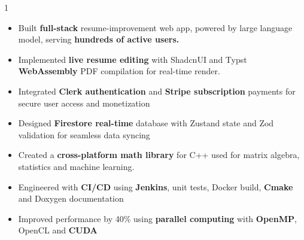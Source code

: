 \documentclass[11pt,a4paper,ragged2e]{altacv}
\begin{document}
\begin{paracol}{1}
\begin{itemize}
\item Built \textbf{full-stack} resume-improvement web app, powered by large language model, serving \textbf{hundreds of active users.}
\item Implemented \textbf{live resume editing} with ShadcnUI and Typst \textbf{WebAssembly} PDF compilation for real-time render.
\item Integrated \textbf{Clerk authentication} and \textbf{Stripe subscription} payments for secure user access and monetization
\item Designed \textbf{Firestore real-time} database with Zustand state and Zod validation for seamless data syncing
\end{itemize}
\tightdivider

\begin{itemize}
\item Created a \textbf{cross-platform math library} for C++ used for matrix algebra, statistics and machine learning.
\item Engineered with \textbf{CI/CD} using \textbf{Jenkins}, unit tests, Docker build, \textbf{Cmake} and Doxygen documentation
\item Improved performance by 40\% using \textbf{parallel computing} with \textbf{OpenMP}, OpenCL and \textbf{CUDA}
\end{itemize}






\end{paracol}
\end{document}
